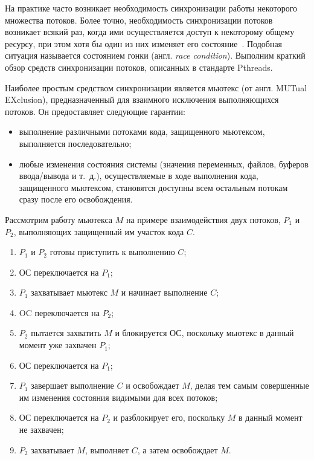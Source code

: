На практике часто возникает необходимость синхронизации работы
некоторого множества потоков.
Более точно, необходимость синхронизации потоков возникает всякий раз,
когда ими осуществляется доступ к некоторому общему ресурсу,
при этом хотя бы один из них изменяет его состояние~\cite{Tanenbaum:2007:MOS:1410217}.
Подобная ситуация называется состоянием гонки (англ. \textit{race condition}).
Выполним краткий обзор средств синхронизации потоков, описанных в стандарте Pthreads.

Наиболее простым средством синхронизации является мьютекс (от англ. MUTual EXclusion),
предназначенный для взаимного исключения выполняющихся потоков.
Он предоставляет следующие гарантии:
\begin{itemize}
  \item выполнение различными потоками кода, защищенного мьютексом,
    выполняется последовательно;
  \item любые изменения состояния системы (значения переменных, файлов,
    буферов ввода/вывода и т.~д.),
    осуществляемые в ходе выполнения кода, защищенного мьютексом,
    становятся доступны всем остальным потокам сразу после его освобождения.
\end{itemize}
\pagebreak

Рассмотрим работу мьютекса \( M \) на примере взаимодействия двух потоков,
\( P_1 \) и \( P_2 \), выполняющих защищенный им участок кода \( C \).
\begin{enumerate}
\item \( P_1 \) и \( P_2 \) готовы приступить к выполнению \( C \);
\item ОС переключается на \( P_1 \);
\item \( P_1 \) захватывает мьютекс \( M \) и начинает выполнение \( C \);
\item OC переключается на \( P_2 \);
\item \( P_2 \) пытается захватить \( M \) и блокируется ОС,
  поскольку мьютекс в данный момент уже захвачен \( P_1 \);
\item ОС переключается на \( P_1 \);
\item \( P_1 \) завершает выполнение \( C \) и освобождает \( M \),
  делая тем самым совершенные им изменения состояния видимыми для всех потоков;
\item ОС переключается на \( P_2 \) и разблокирует его, поскольку \( M \)
  в данный момент не захвачен;
\item \( P_2 \) захватывает \( M \), выполняет \( C \), а затем освобождает \( M \).
\end{enumerate}

